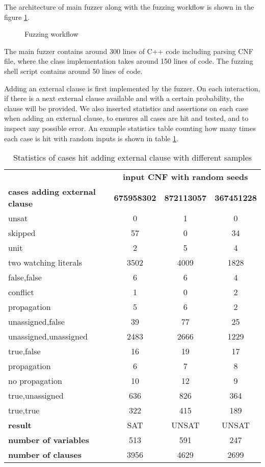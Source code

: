 The architecture of main fuzzer along with the fuzzing workflow is shown in the figure \ref{fig:fuzzer}.

\begin{figure}[h!]
  \centering
  
  \caption{Fuzzing workflow}
  \label{fig:fuzzer}
\end{figure}

The main fuzzer contains around 300 lines of C++ code including parsing CNF file, where the  class implementation takes around 150 lines of code. The fuzzing shell script contains around 50 lines of code.

Adding an external clause is first implemented by the fuzzer. On each interaction, if there is a next external clause available and with a certain probability, the clause will be provided. We also inserted statistics and assertions on each case when adding an external clause, to ensures all cases are hit and tested, and to inspect any possible error. An example statistics table counting how many times each case is hit with random inputs is shown in table \ref{tab:stats}.

\begin{table}[h!]
  \centering
  \begin{tabular}{|l|c|c|c|}
    \hline
    & \multicolumn{3}{c|}{\textbf{input CNF with random seeds}} \\
    \cline{2-4}
    \textbf{cases adding external clause} & \textbf{675958302} & \textbf{872113057} & \textbf{367451228} \\
    \hline
    unsat & 0 & 1 & 0 \\
    skipped & 57 & 0 & 34 \\
    unit & 2 & 5 & 4 \\
    two watching literals & 3502 & 4009 & 1828 \\
    \quad false,false & 6 & 6 & 4 \\
    \quad\quad conflict & 1 & 0 & 2 \\
    \quad\quad propagation & 5 & 6 & 2 \\
    \quad unassigned,false & 39 & 77 & 25 \\
    \quad unassigned,unassigned & 2483 & 2666 & 1229 \\
    \quad true,false & 16 & 19 & 17 \\
    \quad\quad propagation & 6 & 7 & 8 \\
    \quad\quad no propagation & 10 & 12 & 9 \\
    \quad true,unassigned & 636 & 826 & 364 \\
    \quad true,true & 322 & 415 & 189 \\
    \hline
    \textbf{result} & SAT & UNSAT & UNSAT \\
    \textbf{number of variables} & 513 & 591 & 247 \\
    \textbf{number of clauses} & 3956 & 4629 & 2699 \\
    \hline
  \end{tabular}
  \caption{Statistics of cases hit adding external clause with different samples}
  \label{tab:stats}
\end{table}

